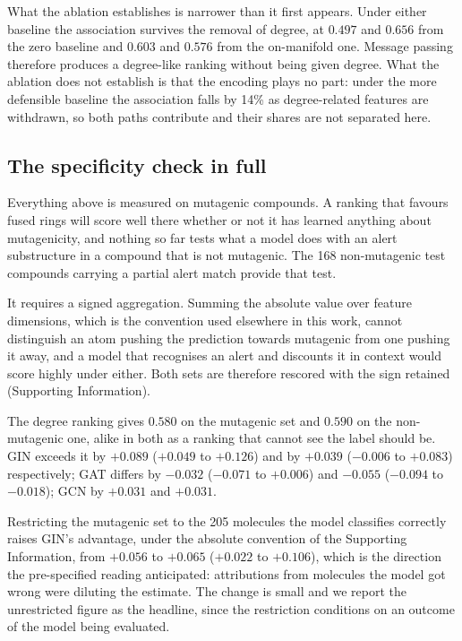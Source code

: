 \documentclass[journal=jcisd8,manuscript=suppinfo]{achemso}
\begin{document}
What the ablation establishes is narrower than it first appears. Under either baseline the
association survives the removal of degree, at $0.497$ and $0.656$ from the zero
baseline and $0.603$ and $0.576$ from the on-manifold one. Message passing therefore produces a
degree-like ranking without being given degree.
What the ablation does not establish is that the encoding plays no part: under the more
defensible baseline the association falls by 14\% as degree-related
features are withdrawn,
so both paths contribute and their shares are not separated here.

\subsection{The specificity check in full}

Everything above is measured on mutagenic compounds. A ranking that favours fused rings will
score well there whether or not it has learned anything about mutagenicity, and nothing so
far tests what a model does with an alert substructure in a compound that is not mutagenic.
The 168 non-mutagenic test compounds carrying a partial alert match provide that test.

It requires a signed aggregation. Summing the absolute value over feature dimensions, which
is the convention used elsewhere in this work, cannot distinguish an atom pushing the
prediction towards mutagenic from one pushing it away, and a model that recognises an alert
and discounts it in context would score highly under either. Both sets are therefore rescored
with the sign retained (Supporting Information).

The degree ranking gives $0.580$ on the mutagenic set and $0.590$ on the non-mutagenic one,
alike in both as a ranking that cannot see the label should be. GIN exceeds it by $+0.089$
($+0.049$ to $+0.126$) and by $+0.039$ ($-0.006$ to $+0.083$) respectively; GAT differs by
$-0.032$ ($-0.071$ to $+0.006$) and $-0.055$ ($-0.094$ to $-0.018$); GCN by $+0.031$ and
$+0.031$.

Restricting the mutagenic set to the 205 molecules the model classifies correctly raises
GIN's advantage, under the absolute convention of the Supporting Information, from $+0.056$ to
$+0.065$ ($+0.022$ to $+0.106$), which is the direction the
pre-specified reading anticipated: attributions from molecules the model got wrong were
diluting the estimate. The change is small and we report the unrestricted figure as the
headline, since the restriction conditions on an outcome of the model being evaluated.
\end{document}
